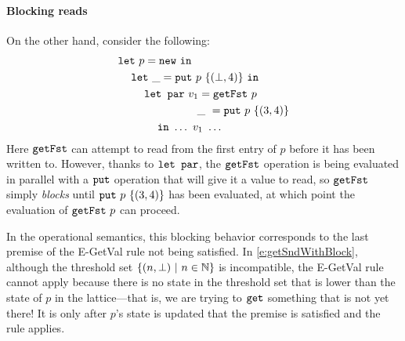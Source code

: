 


\paragraph{Blocking reads}

On the other hand, consider the following:
\begin{equation}
\begin{split}
& \letexp{p}{\NEW}{ \\
& \letspace \letexp{\_}{\putexp{p}{\stateset{(\bot,4)}}}{ \\
& \letspace \letspace \LETPAR ~v_1 = \getfstexp{p} \\
& \letspace \letspace \letparspace \hspace{0.62em}\_~= \putexp{p}{\stateset{(3,4)}} \\
& \letspace \letspace \letspace \IN~ \dots~v_1~\dots }}
\end{split}
\label{e:getSndWithBlock}
\end{equation}
Here $\mbox{\texttt{getFst}}$ can attempt to read from the first entry of $p$ before it
has been written to.  However, thanks to $\mbox{\texttt{\mbox{\texttt{let}}~\mbox{\texttt{par}}}}$, the $\mbox{\texttt{getFst}}$
operation is being evaluated in parallel with a $\mbox{\texttt{put}}$ operation that
will give it a value to read, so $\mbox{\texttt{getFst}}$ simply {\em blocks} until
$\mbox{\texttt{put}}~p~\lbrace (3,4) \rbrace$ has been evaluated, at which
point the evaluation of $\mbox{\texttt{getFst}}~p$ can proceed.

In the operational semantics, this blocking behavior corresponds to
the last premise of the {\sc E-GetVal} rule not being satisfied.  In
\eqref{e:getSndWithBlock}, although the threshold set $\lbrace (n, \bot)
  \ | \  n \in \mathbb{N} \rbrace$ is incompatible, the {\sc E-GetVal} rule
cannot apply because there is no state in the threshold set that is lower
than the state of $p$ in the lattice---that is, we are trying to
$\mbox{\texttt{get}}$ something that is not yet there!  It is only after $p$'s state
is updated that the premise is satisfied and the rule applies.






